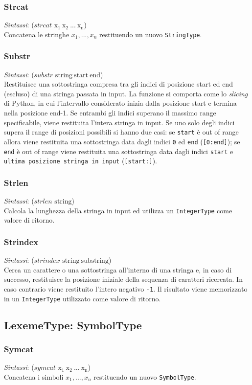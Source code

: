 \subsubsection{Strcat}
\emph{Sintassi}: ($strcat$ $ \mathrm{x_1 \ x_2 \ ... \ x_n}$)\\

Concatena le stringhe $x_1, ..., x_n$ restituendo un nuovo  \verb!StringType!.

\subsubsection{Substr}
\emph{Sintassi}: ($substr$ $ \mathrm{string \ start \ end}$)\\

Restituisce una sottostringa compresa tra gli indici di posizione start ed end (escluso) di una stringa passata in input. La funzione si comporta come lo \emph{slicing} di Python, in cui l'intervallo considerato inizia dalla posizione start e termina nella posizione end-1. Se entrambi gli indici superano il massimo range specificabile, viene restituita l'intera stringa in input. Se uno solo degli indici supera il range di posizioni possibili si hanno due casi: se \verb!start! è out of range allora viene restituita una sottostringa data dagli indici \verb!0! ed \verb!end! (\verb![0:end]!); se \verb!end! è  out of range viene restituita una sottostringa data dagli indici \verb!start! e \verb!ultima posizione stringa in input! (\verb![start:]!).

\subsubsection{Strlen}
\emph{Sintassi}: ($strlen$ $ \mathrm{string}$)\\

Calcola la lunghezza della stringa in input ed utilizza un \verb!IntegerType! come valore di ritorno.

\subsubsection{Strindex}
\emph{Sintassi}: ($strindex$ $ \mathrm{string \ substring}$)\\

Cerca un carattere o una sottostringa all'interno di una stringa e, in caso di successo, restituisce la posizione iniziale della sequenza di caratteri ricercata. In caso contrario viene restituito l'intero negativo \verb!-1!. Il risultato viene memorizzato in un \verb!IntegerType! utilizzato come valore di ritorno.

\subsection{LexemeType: SymbolType}

\subsubsection{Symcat}
\emph{Sintassi}: ($symcat$ $ \mathrm{x_1 \ x_2 \ ... \ x_n}$)\\

Concatena i simboli $x_1, ..., x_n$ restituendo un nuovo  \verb!SymbolType!.

